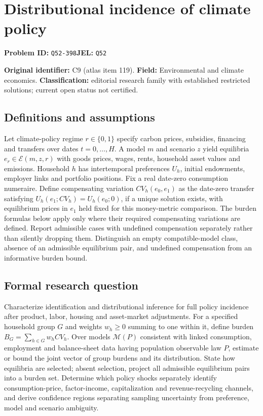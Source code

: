 \documentclass[11pt,a4paper]{article}
\begin{document}
\section*{Distributional incidence of climate policy}
\textbf{Problem ID:} \texttt{Q52-398}\quad \textbf{JEL:} \texttt{Q52}\par
\label{problem:OP-0119}
\label{atlas:prob:C9}

\noindent\textbf{Original identifier:} C9 (atlas item 119). \textbf{Field:} Environmental and climate economics. \textbf{Classification:} editorial research family with established restricted solutions; current open status not certified.

\subsection*{Definitions and assumptions}

Let climate-policy regime $r\in\{0,1\}$ specify carbon prices, subsidies, financing and transfers over dates $t=0,\ldots,H$. A model $m$ and scenario $z$ yield equilibria $e_r\in\mathcal E(m,z,r)$ with goods prices, wages, rents, household asset values and emissions. Household $h$ has intertemporal preferences $U_h$, initial endowments, employer links and portfolio positions. Fix a real date-zero consumption numeraire. Define compensating variation $CV_h(e_0,e_1)$ as the date-zero transfer satisfying $U_h(e_1;CV_h)=U_h(e_0;0)$, if a unique solution exists, with equilibrium prices in $e_1$ held fixed for this money-metric comparison. The burden formulas below apply only where their required compensating variations are defined. Report admissible cases with undefined compensation separately rather than silently dropping them. Distinguish an empty compatible-model class, absence of an admissible equilibrium pair, and undefined compensation from an informative burden bound.

\subsection*{Formal research question}

Characterize identification and distributional inference for full policy incidence after product, labor, housing and asset-market adjustments. For a specified household group $G$ and weights $w_h\ge0$ summing to one within it, define burden $B_G=\sum_{h\in G}w_hCV_h$. Over models $\mathcal M(P)$ consistent with linked consumption, employment and balance-sheet data having population observable law $P$, estimate or bound the joint vector of group burdens and its distribution. State how equilibria are selected; absent selection, project all admissible equilibrium pairs into a burden set. Determine which policy shocks separately identify consumption-price, factor-income, capitalization and revenue-recycling channels, and derive confidence regions separating sampling uncertainty from preference, model and scenario ambiguity.
\end{document}
